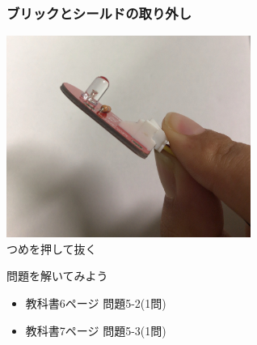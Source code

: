 \begin{frame}
    \frametitle{ブリックとシールドの取り外し}
    \begin{center}
        \includegraphics[width=0.6\textwidth]{images/chap05/text05-img011.jpg}
        {\\つめを押して抜く}
    \end{center}
\end{frame}

\begin{frame}[fragile]
    \begin{exampleblock}{問題を解いてみよう}
        \begin{itemize}
            \item 教科書6ページ 問題5-2(1問)
            \item 教科書7ページ 問題5-3(1問)
        \end{itemize}
    \end{exampleblock} 
\end{frame}
